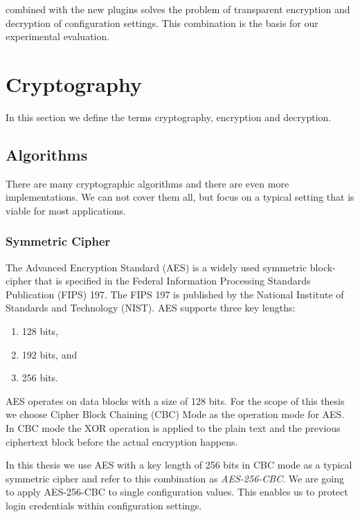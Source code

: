 \elektra{} combined with the new plugins solves the problem of transparent encryption and decryption of configuration settings.
This combination is the basis for our experimental evaluation.

\section{Cryptography}

In this section we define the terms cryptography, encryption and decryption.

\subsection{Algorithms}

There are many cryptographic algorithms and there are even more implementations.
We can not cover them all, but focus on a typical setting that is viable for most applications.

\subsubsection{Symmetric Cipher}

The Advanced Encryption Standard (AES) is a widely used symmetric block-cipher that is specified in the Federal Information Processing Standards Publication (FIPS) 197.
The FIPS 197 is published by the National Institute of Standards and Technology (NIST).\cite{fips197}
AES supports three key lengths:
\begin{enumerate}
  \item 128 bits,
  \item 192 bits, and
  \item 256 bits.
\end{enumerate}

AES operates on data blocks with a size of 128 bits.\cite{fips197,stallings2014}
For the scope of this thesis we choose Cipher Block Chaining (CBC) Mode as the operation mode for AES.
In CBC mode the XOR operation is applied to the plain text and the previous ciphertext block before the actual encryption happens.\cite{bruceschneier1996,stallings2014}

In this thesis we use AES with a key length of 256 bits in CBC mode as a typical symmetric cipher and refer to this combination as \emph{AES-256-CBC}.
We are going to apply AES-256-CBC to single configuration values.
This enables us to protect login credentials within configuration settings.

